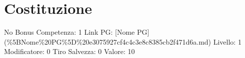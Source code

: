 \section{Costituzione}\label{costituzione}

\begin{description}
\tightlist
\item[Tags: STAT]
No Bonus Competenza: 1 Link PG: {[}Nome PG{]}
(\%5BNome\%20PG\%5D\%20e3075927cf4c4c3e8c8385cb2f471d6a.md) Livello: 1
Modificatore: 0 Tiro Salvezza: 0 Valore: 10
\end{description}
